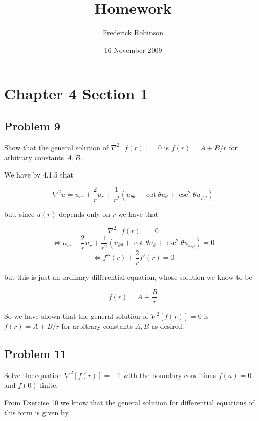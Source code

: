 \documentclass[12pt]{article}
\title{Homework}
\author{Frederick Robinson}
\date{16 November 2009}
\begin{document}

\maketitle

\setcounter{tocdepth}{2} 

\tableofcontents

\section{Chapter 4 Section 1}

\subsection{Problem 9}\label{4.1.9}
Show that the general solution of $\nabla^2\left[f(r)\right]=0$ is $f(r)=A+B/r$ for arbitrary constants $A, B$.

We have \cite[Page 237]{pinsky} by 4.1.5 that

\begin{equation}\label{laplacian}\nabla^2u=u_{rr}+\frac{2}{r}u_r+\frac{1}{r^2}(u_{\theta\theta}+\cot{\theta}u_\theta+\csc^2{\theta}u_{\varphi\varphi})\end{equation}

but, since $u(r)$ depends only on $r$ we have that

\[\nabla^2\left[f(r)\right]=0\]
\[\iff u_{rr}+\frac{2}{r}u_r+\frac{1}{r^2}(u_{\theta\theta}+\cot{\theta}u_\theta+\csc^2{\theta}u_{\varphi\varphi})=0\]
\[\iff f''(r)+\frac{2}{r}f'(r)=0\]

but this is just an ordinary differential equation, whose solution we know to be

\begin{equation}\label{homo}f(r)=A+\frac{B}{r}\end{equation}

So we have shown that the general solution of $\nabla^2\left[f(r)\right]=0$ is $f(r)=A+B/r$ for arbitrary constants $A, B$ as desired.

\subsection{Problem 11}

Solve the equation $\nabla^2\left[f(r)\right]=-1$ with the boundary conditions $f(a)=0$ and $f(0)$  finite.

From Exercise 10 \cite[Page 250]{pinsky} we know that the general solution for differential equations of this form is given by
\end{document}
